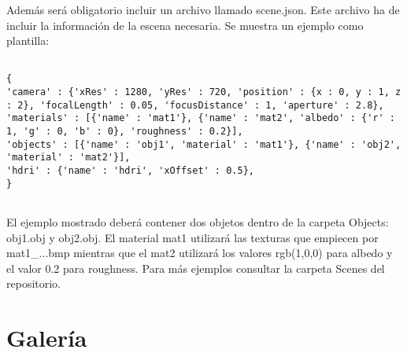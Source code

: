 Además será obligatorio incluir un archivo llamado scene.json. Este archivo ha de incluir la información de la escena necesaria. Se muestra un ejemplo como plantilla:

\begin{lstlisting}
	
{	
'camera' : {'xRes' : 1280, 'yRes' : 720, 'position' : {x : 0, y : 1, z : 2}, 'focalLength' : 0.05, 'focusDistance' : 1, 'aperture' : 2.8},
'materials' : [{'name' : 'mat1'}, {'name' : 'mat2', 'albedo' : {'r' : 1, 'g' : 0, 'b' : 0}, 'roughness' : 0.2}],
'objects' : [{'name' : 'obj1', 'material' : 'mat1'}, {'name' : 'obj2', 'material' : 'mat2'}],
'hdri' : {'name' : 'hdri', 'xOffset' : 0.5},
}
	
\end{lstlisting}

El ejemplo mostrado deberá contener dos objetos dentro de la carpeta Objects: obj1.obj y obj2.obj. El material mat1 utilizará las texturas que empiecen por mat1\_...bmp mientras que el mat2 utilizará los valores rgb(1,0,0) para albedo y el valor 0.2 para roughness. Para más ejemplos consultar la carpeta Scenes del repositorio.

\section{Galería}
	